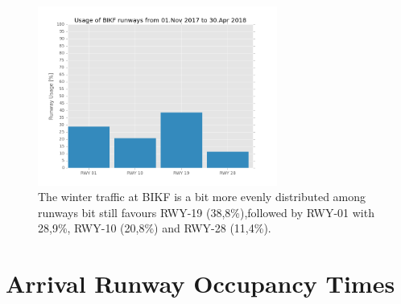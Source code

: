 \begin{figure}[h]
    \centering
    \includegraphics[width=0.7\textwidth]{graphics/fig_runway_usage_winter}
    \caption[Winter runway usage at BIKF]{The winter traffic at BIKF is a bit more evenly distributed among runways bit still favours RWY-19 (38,8\%),followed by RWY-01 with 28,9\%, RWY-10 (20,8\%) and RWY-28 (11,4\%).}
    \label{fig:runway_usage_winter}
\end{figure}


\chapter{Arrival Runway Occupancy Times\label{cha:AROTs}}


\begin{table}[h]
\centering
{}
\caption[AROTs for the air traffic mix by RECAT]{AROT statistics for the air traffic mix at BIKF by RECAT-EU categories. The count is the number of landings in peak hours since October 2017}
\label{tab:AROT_RECAT_stats}
\end{table}


